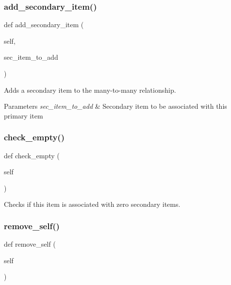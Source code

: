 \subsubsection{\texorpdfstring{add\_secondary\_item()}{add\_secondary\_item()}}
{\footnotesize\ttfamily def add\+\_\+secondary\+\_\+item (\begin{DoxyParamCaption}\item[{}]{self,  }\item[{}]{sec\+\_\+item\+\_\+to\+\_\+add }\end{DoxyParamCaption})}



Adds a secondary item to the many-\/to-\/many relationship. 


\begin{DoxyParams}{Parameters}
{\em sec\+\_\+item\+\_\+to\+\_\+add} & Secondary item to be associated with this primary item \\
\hline
\end{DoxyParams}
\mbox{\label{classjoinapp_1_1models_1_1items_1_1_primary_item_a2c3ae2e498290b3837d39fd123eeb1d3}} 
\subsubsection{\texorpdfstring{check\_empty()}{check\_empty()}}
{\footnotesize\ttfamily def check\+\_\+empty (\begin{DoxyParamCaption}\item[{}]{self }\end{DoxyParamCaption})}



Checks if this item is associated with zero secondary items. 

\mbox{\label{classjoinapp_1_1models_1_1items_1_1_primary_item_af433a8dae46e760513860737f65c09c0}} 
\subsubsection{\texorpdfstring{remove\_self()}{remove\_self()}}
{\footnotesize\ttfamily def remove\+\_\+self (\begin{DoxyParamCaption}\item[{}]{self }\end{DoxyParamCaption})}



